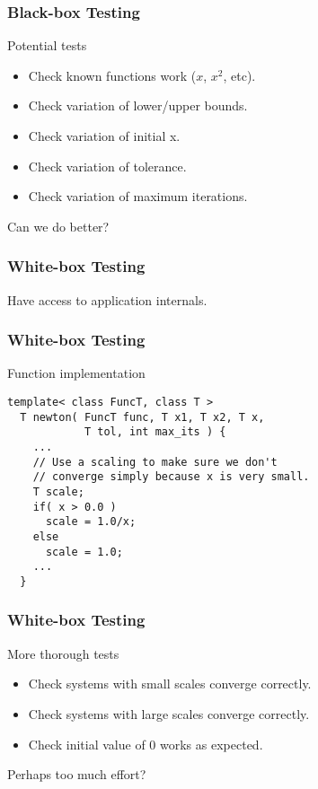 \begin{frame}[fragile]
  \frametitle{Black-box Testing}
  \begin{block}{Potential tests}
    \begin{itemize}
    \item Check known functions work ($x$, $x^2$, etc).
    \item Check variation of lower/upper bounds.
    \item Check variation of initial x.
    \item Check variation of tolerance.
    \item Check variation of maximum iterations.
    \end{itemize}
  \end{block}
  \pause
  \vspace{1cm}
  {\LARGE\color{Base0A} Can we do better?}
\end{frame}

\begin{frame}
  \frametitle{White-box Testing}
  Have access to application internals.
\end{frame}

\begin{frame}[fragile]
  \frametitle{White-box Testing}
  \begin{block}{Function implementation}
    \begin{lstlisting}[style=C]
  template< class FuncT, class T >
  T newton( FuncT func, T x1, T x2, T x,
            T tol, int max_its ) {
    ...
    // Use a scaling to make sure we don't
    // converge simply because x is very small.
    T scale;
    if( x > 0.0 )
      scale = 1.0/x;
    else
      scale = 1.0;
    ...
  }
    \end{lstlisting}
  \end{block}
\end{frame}

\begin{frame}[fragile]
  \frametitle{White-box Testing}
  \begin{block}{More thorough tests}
    \begin{itemize}
    \item Check systems with small scales converge correctly.
    \item Check systems with large scales converge correctly.
    \item Check initial value of 0 works as expected.
    \end{itemize}
  \end{block}
  \pause
  \vspace{1cm}
  {\LARGE\color{Base0A} Perhaps too much effort?}
\end{frame}

